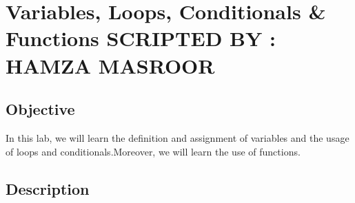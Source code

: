\documentclass[11pt,fleqn]{book} %
\begin{document}
	
	
	\pagestyle{empty} %
	
	\tableofcontents %
	
	\cleardoublepage %
	
	\chapter{Variables, Loops, Conditionals \& Functions {\textsc{\small SCRIPTED BY : HAMZA MASROOR}}}
	
	\section{Objective}
	In this lab, we will learn the definition and assignment of variables and the usage of loops and conditionals.Moreover, we will learn the use of functions.
	\section{Description} 
\end{document}
